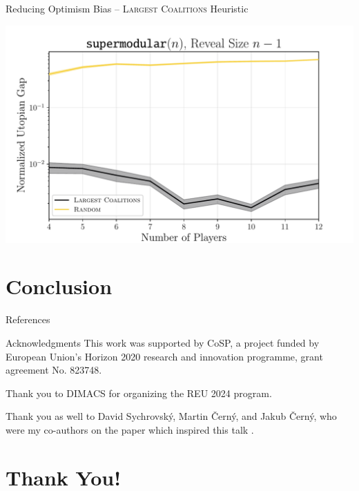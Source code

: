 \documentclass[]{beamer}
\begin{document}
\begin{frame}{Reducing Optimism Bias -- \textsc{Largest Coalitions} Heuristic}
	\begin{center}
		\includegraphics[width=\textwidth]{figures/convex_linear.pdf}
	\end{center}
\end{frame}

\section{Conclusion}

\begin{frame}[allowframebreaks]{References}
    \nocite{*}
    \printbibliography[heading=none]
\end{frame}

\begin{frame}{Acknowledgments}
	This work was supported by CoSP, a project funded by European Union’s Horizon
	2020 research and innovation programme, grant agreement No. 823748.

	Thank you to DIMACS for organizing the REU 2024 program.

	Thank you as well to David Sychrovský, Martin Černý, and Jakub Černý, who
	were my co-authors on the paper which inspired this talk \citep{uradnik2024reducing}.
\end{frame}

\section{Thank You!}
\end{document}

